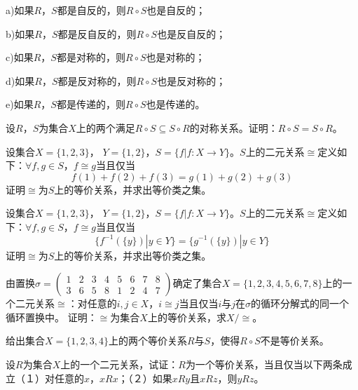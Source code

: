 \documentclass{article}
\begin{document}
\begin{CJK}{UTF8}{gbsn}
\begin{Exercise}
  a)如果$R$，$S$都是自反的，则$R\circ S$也是自反的；

  b)如果$R$，$S$都是反自反的，则$R\circ S$也是反自反的；

  c)如果$R$，$S$都是对称的，则$R\circ S$也是对称的；

  d)如果$R$，$S$都是反对称的，则$R\circ S$也是反对称的；


  e)如果$R$，$S$都是传递的，则$R\circ S$也是传递的。
\end{Exercise}
\vspace{2cm}
\begin{Exercise}
设$R$，$S$为集合$X$上的两个满足$R\circ S\subseteq S\circ R$的对称关系。证明：$R\circ S= S\circ R$。
\end{Exercise}
  \vspace{10cm}
  \begin{Exercise}
    设集合$X = \{1,2,3\}$， $Y = \{1,2\}$，$S = \{f|f:X \to Y\}$。$S$上的二元关系$\cong$定义如下：$\forall f,g\in S$，$f \cong g$当且仅当\[f(1) + f(2) + f(3) = g(1) + g(2) + g(3)\]证明$\cong$为$S$上的等价关系，并求出等价类之集。    
  \end{Exercise}
  \vspace{10cm}
 \begin{Exercise}
  设集合$X = \{1,2,3\}$， $Y = \{1,2\}$，$S = \{f|f:X \to Y\}$。$S$上的二元关系$\cong$定义如下：$\forall f,g\in S$，$f \cong g$当且仅当\[\{f^{-1}(\{y\}) | y \in Y\} = \{g^{-1}(\{y\})|y \in Y\}\]证明$\cong$为$S$上的等价关系，并求出等价类之集。  
\end{Exercise}

\vspace{10cm}
\begin{Exercise}
由置换$\sigma=\begin{pmatrix}1&2&3&4&5&6&7&8\\3&6&5&8&1&2&4&7\end{pmatrix}$确定了集合$X=\{1,2,3,4,5,6,7,8\}$上的一个二元关系$\cong$：对任意的$i,j\in X$，$i\cong j$当且仅当$i$与$j$在$\sigma$的循环分解式的同一个循环置换中。
证明：$\cong$为集合$X$上的等价关系，求$X/\cong$。
\end{Exercise}
\vspace{5cm}
\begin{Exercise}
 给出集合$X=\{1,2,3,4\}$上的两个等价关系$R$与$S$，使得$R\circ S$不是等价关系。
\end{Exercise}
\vspace{10cm}
\begin{Exercise}
  设$R$为集合$X$上的一个二元关系，试证：$R$为一个等价关系，当且仅当以下两条成立（１）对任意的$x$，$xRx$；（２）如果$xRy$且$xRz$，则$yRz$。
\end{Exercise}
\vspace{10cm}


\end{CJK}
\end{document}
